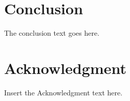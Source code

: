\documentclass{comnet}%
\begin{document}
\section{Conclusion}
The conclusion text goes here. \cite{Ahn1983,Chen1995,Chen1993,Chen2001,Chen2003,Clarke1983,Hock1981,Murty1988}



\section*{Acknowledgment}

Insert the Acknowledgment text here.




%







\end{document}
